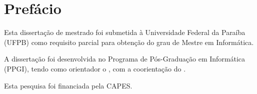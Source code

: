 \chapter*{Prefácio}

Esta dissertação de mestrado foi submetida à Universidade Federal da Paraíba (UFPB) como requisito parcial para obtenção do grau de Mestre em Informática. 

A dissertação foi desenvolvida no Programa de Pós-Graduação em Informática (PPGI),  tendo como orientador o \textbf{\thesisAdvisor}, com a coorientação do \textbf{\thesisCoAdvisor}. 

Esta pesquisa foi financiada pela CAPES.

\cleardoublepage